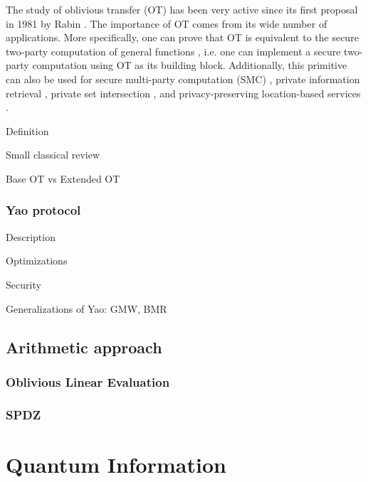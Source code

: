 The study of oblivious transfer (OT) has been very active since its first proposal in 1981 by Rabin \cite{Rabin81}. The importance of OT comes from its wide number of applications. More specifically, one can prove that OT is equivalent to the secure two-party computation of general functions \cite{Y86, K88}, i.e. one can implement a secure two-party computation using OT as its building block. Additionally, this primitive can also be used for secure multi-party computation (SMC) \cite{KOS16}, private information retrieval \cite{Che04}, private set intersection \cite{MEP17}, and privacy-preserving location-based services \cite{BHM+19}. 









Definition

Small classical review 

Base OT vs Extended OT

\subsubsection{Yao protocol}

Description

Optimizations

Security

Generalizations of Yao: GMW, BMR

\subsection{Arithmetic approach}

\subsubsection{Oblivious Linear Evaluation}

\subsubsection{SPDZ}





\section{Quantum Information}

